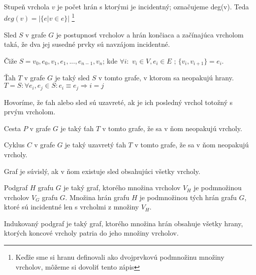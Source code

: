 \begin{defin}
Stupeň vrchola $v$ je počet hrán s ktorými je incidentný; označujeme deg(v).
Teda $deg(v) = |\{e | v \in e\}|$ \footnote{Keďže sme si hranu definovali ako
dvojprvkovú podmnožinu množiny vrcholov, môžeme si dovoliť tento zápis}
\end{defin}
  
\begin{defin}
Sled $S$ v grafe $G$ je postupnosť vrcholov a hrán končiaca a začínajúca vrcholom taká,
že dva jej susedné prvky sú navzájom incidentné.

Čiže $S = v_{0},e_{0},v_{1},e_{1}, ... ,e_{n-1},v_{n}$; kde $\forall i:$ 
$v_{i} \in V, e_{i} \in E$ ; $\{v_{i},v_{i+1}\} = e_{i}$.
\end{defin}

\begin{defin}
Ťah $T$ v grafe $G$ je taký sled $S$ v tomto grafe, v ktorom sa neopakujú hrany.
$T = S : \forall e_{i},e_{j} \in S : e_{i} \equiv e_{j} \Rightarrow i = j$
\end{defin}

\begin{defin}
Hovoríme, že ťah alebo sled sú uzavreté, ak je ich posledný vrchol totožný s
prvým vrcholom.
\end{defin}

\begin{defin}
Cesta $P$ v grafe $G$ je taký ťah $T$ v tomto grafe, že sa v ňom neopakujú
vrcholy. 
\end{defin}

\begin{defin}
Cyklus $C$ v grafe $G$ je taký uzavretý ťah $T$ v tomto grafe, že sa v ňom
neopakujú vrcholy.
\end{defin}

\begin{defin}
Graf je súvislý, ak v ňom existuje sled obsahujúci všetky vrcholy.
\end{defin}

\begin{defin}
Podgraf $H$ grafu $G$ je taký graf, ktorého množina vrcholov $V_{H}$ je
podmnožinou vrcholov $V_{G}$ grafu $G$. Množina hrán grafu $H$ je
podmnožinou tých hrán grafu $G$, ktoré sú incidentné len s vrcholmi z
množiny $V_{H}$.

Indukovaný podgraf je taký graf, ktorého množina hrán obsahuje všetky hrany,
ktorých koncové vrcholy patria do jeho množiny vrcholov.
\end{defin}

